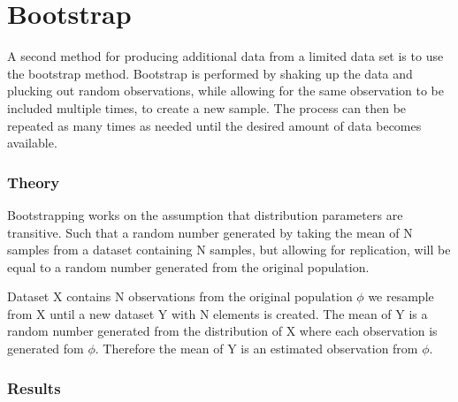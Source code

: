 \chapter{Bootstrap} \label{ch:bootstrap}

A second method for producing additional data from a limited data set is to use the bootstrap method. Bootstrap is performed by shaking up the data and plucking out random observations, while allowing for the same observation to be included multiple times, to create a new sample. The process can then be repeated as many times as needed until the desired amount of data becomes available. 

\subsection{Theory}

Bootstrapping works on the assumption that distribution parameters are transitive. Such that a random number generated by taking the mean of N samples from a dataset containing N samples, but allowing for replication, will be equal to a random number generated from the original population.

Dataset X contains N observations from the original population $\phi$ we resample from X until a new dataset Y with N elements is created. The mean of Y is a random number generated from the distribution of X where each observation is generated fom $\phi$. Therefore the mean of Y is an estimated observation from $\phi$.

\iffalse %
Bootstrapping works by resampling the initial data with replacement, until a new data set has been created from the original. The new dataset will then contain a random sample of data with the same distribution as the original, allowing for some deviation in the parameters. By repeating this B times and averaging the distribution parameters over all B samples we get a better estimate of the original population as if we had gotten more observations.

As an example, assuming we have a normally distributed population of N elements then by taking a random resampling from that dataset until a new dataset, also containing N elements, is gained. The mean of that new dataset can then be seen as an estimated new observation from the original population. We then repeat this process B times and in the end we have a new data set of both resampled means and variances. Since both were generated using the original set of observations the set of resamples will also be normally distributed with a mean and variance close to the original population. 
\fi

\subsection{Results}



